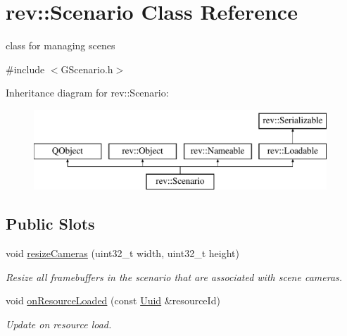 \hypertarget{classrev_1_1_scenario}{}\section{rev\+::Scenario Class Reference}
\label{classrev_1_1_scenario}


class for managing scenes  




{\ttfamily \#include $<$G\+Scenario.\+h$>$}

Inheritance diagram for rev\+::Scenario\+:\begin{figure}[H]
\begin{center}
\leavevmode
\includegraphics[height=3.000000cm]{classrev_1_1_scenario}
\end{center}
\end{figure}
\subsection*{Public Slots}
\begin{DoxyCompactItemize}
\item 
\mbox{\label{classrev_1_1_scenario_a2607c0a93c87bc055577172b00985a7e}} 
void \mbox{\hyperlink{classrev_1_1_scenario_a2607c0a93c87bc055577172b00985a7e}{resize\+Cameras}} (uint32\+\_\+t width, uint32\+\_\+t height)
\begin{DoxyCompactList}\small\item\em Resize all framebuffers in the scenario that are associated with scene cameras. \end{DoxyCompactList}\item 
\mbox{\label{classrev_1_1_scenario_a667c37ea2af2fe8a805a3271ae5dda58}} 
void \mbox{\hyperlink{classrev_1_1_scenario_a667c37ea2af2fe8a805a3271ae5dda58}{on\+Resource\+Loaded}} (const \mbox{\hyperlink{classrev_1_1_uuid}{Uuid}} \&resource\+Id)
\begin{DoxyCompactList}\small\item\em Update on resource load. \end{DoxyCompactList}\end{DoxyCompactItemize}
